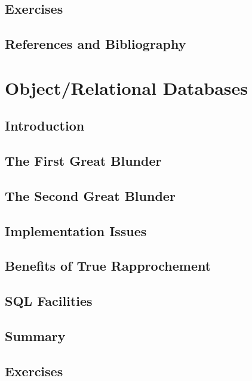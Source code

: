\documentclass{book}
\begin{document}
\section{Exercises}

\section{References and Bibliography}












\chapter{Object/Relational Databases}

\section{Introduction}

\section{The First Great Blunder}

\section{The Second Great Blunder}

\section{Implementation Issues}

\section{Benefits of True Rapprochement}

\section{SQL Facilities}

\section{Summary}

\section{Exercises}
\end{document}
